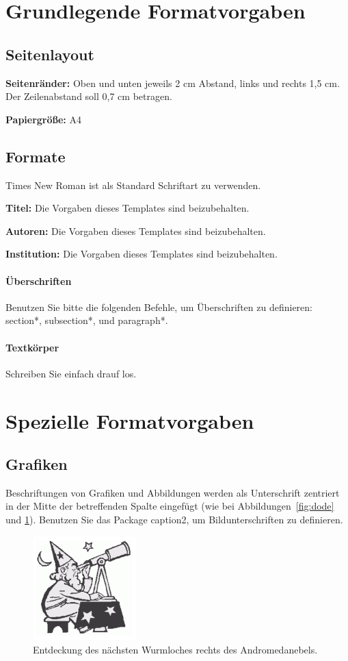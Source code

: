 \documentclass[a4paper, 10pt, twocolumn]{article}
\begin{document}
\section*{Grundlegende Formatvorgaben}
\label{sec:BasicFormats}
\subsection*{Seitenlayout}
\textbf{Seitenränder:} Oben und unten jeweils 2 cm Abstand, links und rechts 1,5 cm. Der Zeilenabstand soll 0,7 cm betragen.

\textbf{Papiergröße:} A4
\subsection*{Formate}
Times New Roman ist als Standard Schriftart zu verwenden.

\textbf{Titel:} Die Vorgaben dieses Templates sind beizubehalten.

\textbf{Autoren:} Die Vorgaben dieses Templates sind beizubehalten.

\textbf{Institution:} Die Vorgaben dieses Templates sind beizubehalten.
\paragraph*{Überschriften} Benutzen Sie bitte die folgenden Befehle, um Überschriften zu definieren: section*, subsection*, und paragraph*.
\paragraph*{Textkörper} Schreiben Sie einfach drauf los.
\section*{Spezielle Formatvorgaben}
\label{sec:SpecialFormats}
\subsection*{Grafiken}
Beschriftungen von Grafiken und Abbildungen werden als Unterschrift zentriert in der Mitte der betreffenden Spalte eingefügt (wie bei Abbildungen~\ref{fig:dode} und \ref{fig:Erwin}). Benutzen Sie das Package caption2, um Bildunterschriften zu definieren.
\begin{figure}[htb]
    \begin{center}
        \includegraphics[width=4cm]{Erwin}
    \end{center}
    \caption{Entdeckung des nächsten Wurmloches rechts des Andromedanebels.}
    \label{fig:Erwin}
\end{figure}
\end{document}
